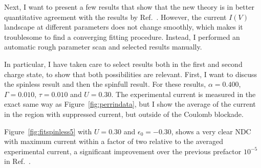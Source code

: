 Next, I want to present a few results that show that the new theory is in better quantitative agreement with the results by Ref.~\cite{perrinnano}. However, the current $I(V)$ landscape at different parameters does not change smoothly, which makes it troublesome to find a converging fitting procedure. Instead, I performed an automatic rough parameter scan and selected results manually.

In particular, I have taken care to select results both in the first and second charge state, to show that both possibilities are relevant. First, I want to discuss the spinless result and then the spinfull result. For these results, $\alpha=0.400$, $\Gamma=0.010$, $\tau=0.010$ and $U=0.30$. The experimental current is measured in the exact same way as Figure~\ref{fig:perrindata}, but I show the average of the current in the region with suppressed current, but outside of the Coulomb blockade.

Figure~\ref{fig:fitspinless5} with $U=0.30$ and $\epsilon_0=-0.30$, shows a very clear NDC with maximum current within a factor of two relative to the averaged experimental current, a significant improvement over the previous prefactor $10^{-5}$ in Ref.~\cite{perrinnano}.



